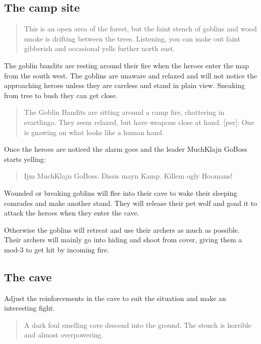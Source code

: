 \documentclass[11pt, twoside, titlepage, a4paper]{report}
\newenvironment{readoutloud}%
{\begin{quote}\begin{itshape}}%
{\end{itshape}\end{quote}}%
\begin{document}
\subsection*{The camp site}

\begin{readoutloud}
This is an open area of the forest, but the faint stench of goblins and wood smoke is drifting between the trees. Listening, you can make out faint gibberish and occasional yells further north east.
\end{readoutloud}

The goblin bandits are resting around their fire when the heroes enter the map from the south west. The goblins are unaware and relaxed and will not notice the approaching heroes unless they are careless and stand in plain view. Sneaking from tree to bush they can get close.

\begin{readoutloud}
The Goblin Bandits are sitting around a camp fire, chattering in svartlingo. They seem relaxed, but have weapons close at hand.
[per]: One is gnawing on what looks like a human hand.
\end{readoutloud}

Once the heroes are noticed the alarm goes and the leader MuchKlajn GoBoss starts yelling:

\begin{readoutloud}
Ijm MuchKlajn GoBoss. Dissis mayn Kamp. Killem ogly Hoomans!
\end{readoutloud}

Wounded or breaking goblins will flee into their cave to wake their sleeping comrades and make another stand. They will release their pet wolf and goad it to attack the heroes when they enter the cave.

Otherwise the goblins will retreat and use their archers as much as possible. Their archers will mainly go into hiding and shoot from cover, giving them a mod-3 to get hit by incoming fire.


\subsection*{The cave}
Adjust the reinforcements in the cave to suit the situation and make an interesting fight.

\begin{readoutloud}
A dark foul smelling cave descend into the ground. The stench is horrible and almost overpowering.
\end{readoutloud}
\end{document}

